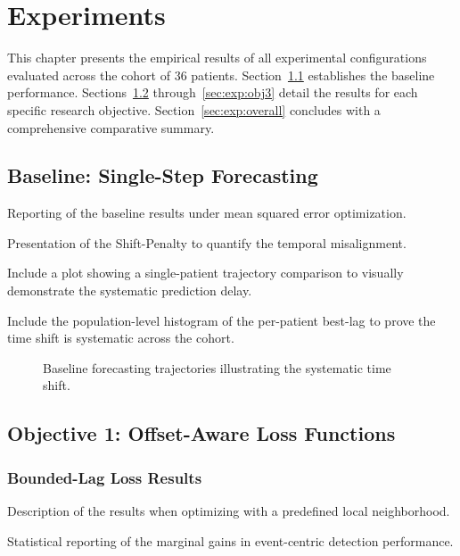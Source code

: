 \chapter{Experiments} \label{ch:experiments}
This chapter presents the empirical results of all experimental configurations evaluated across the cohort of 36 patients. Section~\ref{sec:exp:baseline} establishes the baseline performance. Sections~\ref{sec:exp:obj1} through~\ref{sec:exp:obj3} detail the results for each specific research objective. Section~\ref{sec:exp:overall} concludes with a comprehensive comparative summary.

\section{Baseline: Single-Step Forecasting} \label{sec:exp:baseline}
\begin{planned}
    \item Reporting of the baseline results under mean squared error optimization.
    \item Presentation of the Shift-Penalty to quantify the temporal misalignment.
    \item Include a plot showing a single-patient trajectory comparison to visually demonstrate the systematic prediction delay.
    \item Include the population-level histogram of the per-patient best-lag to prove the time shift is systematic across the cohort.
\end{planned}

\begin{figure}[H]
    \centering
    \caption{Baseline forecasting trajectories illustrating the systematic time shift.}
    \label{fig:exp:baseline_curves}
\end{figure}

\section{Objective 1: Offset-Aware Loss Functions} \label{sec:exp:obj1}
\subsection{Bounded-Lag Loss Results}
\begin{planned}
    \item Description of the results when optimizing with a predefined local neighborhood.
    \item Statistical reporting of the marginal gains in event-centric detection performance.
\end{planned}


